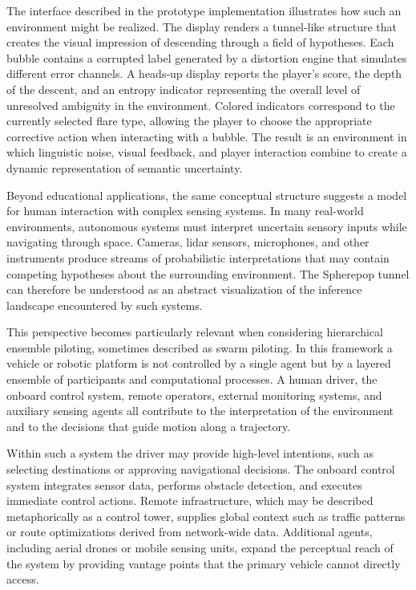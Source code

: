 \documentclass[11pt]{article}
\begin{document}
The interface described in the prototype implementation illustrates how such an environment might be realized. The display renders a tunnel-like structure that creates the visual impression of descending through a field of hypotheses. Each bubble contains a corrupted label generated by a distortion engine that simulates different error channels. A heads-up display reports the player's score, the depth of the descent, and an entropy indicator representing the overall level of unresolved ambiguity in the environment. Colored indicators correspond to the currently selected flare type, allowing the player to choose the appropriate corrective action when interacting with a bubble. The result is an environment in which linguistic noise, visual feedback, and player interaction combine to create a dynamic representation of semantic uncertainty.

Beyond educational applications, the same conceptual structure suggests a model for human interaction with complex sensing systems. In many real-world environments, autonomous systems must interpret uncertain sensory inputs while navigating through space. Cameras, lidar sensors, microphones, and other instruments produce streams of probabilistic interpretations that may contain competing hypotheses about the surrounding environment. The Spherepop tunnel can therefore be understood as an abstract visualization of the inference landscape encountered by such systems.

This perspective becomes particularly relevant when considering hierarchical ensemble piloting, sometimes described as swarm piloting. In this framework a vehicle or robotic platform is not controlled by a single agent but by a layered ensemble of participants and computational processes. A human driver, the onboard control system, remote operators, external monitoring systems, and auxiliary sensing agents all contribute to the interpretation of the environment and to the decisions that guide motion along a trajectory.

Within such a system the driver may provide high-level intentions, such as selecting destinations or approving navigational decisions. The onboard control system integrates sensor data, performs obstacle detection, and executes immediate control actions. Remote infrastructure, which may be described metaphorically as a control tower, supplies global context such as traffic patterns or route optimizations derived from network-wide data. Additional agents, including aerial drones or mobile sensing units, expand the perceptual reach of the system by providing vantage points that the primary vehicle cannot directly access.
\end{document}
